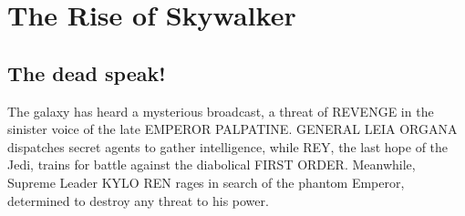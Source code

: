 \documentclass[oneside]{ifgw}
\begin{document}
\lipsum[1-10]


\chapter{The Rise of Skywalker}

\section{The dead speak!}

The galaxy has heard a mysterious broadcast, a threat of REVENGE in the sinister voice of the late EMPEROR PALPATINE. GENERAL LEIA ORGANA dispatches secret agents to gather intelligence, while REY, the last hope of the Jedi, trains for battle against the diabolical FIRST ORDER. Meanwhile, Supreme Leader KYLO REN rages in search of the phantom Emperor, determined to destroy any threat to his power.

\lipsum[1-20]
\end{document}
